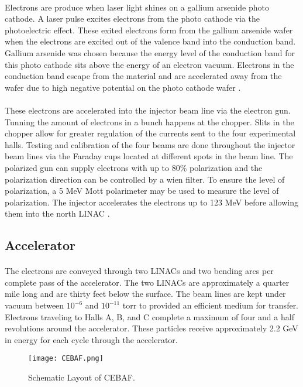 	\paragraph{}Electrons are produce when laser light shines on a gallium arsenide photo cathode. A laser pulse excites electrons from the photo cathode via the photoelectric effect. These exited electrons form from the gallium arsenide wafer when the electrons are excited out of the valence band into the conduction band. Gallium arsenide was chosen because the energy level of the conduction band for this photo cathode sits above the energy of an electron vacuum. Electrons in the conduction band  escape from the material and are accelerated away from the wafer due to high negative potential on the photo cathode wafer \cite{sane}. 
	\paragraph{}These electrons are accelerated into the injector beam line via the electron gun. Tunning the amount of electrons in a bunch happens at the chopper. Slits in the chopper allow for greater regulation of the currents sent to the four experimental halls. Testing and calibration of the four beams are done throughout the injector beam lines via the Faraday cups located at different spots in the beam line. The polarized gun can supply electrons with up to 80$\%$ polarization and the polarization direction can be controlled by a wien filter. To ensure the level of polarization, a 5 MeV Mott polarimeter may be used to measure the level of polarization\cite{HallA}. The injector accelerates the electrons up to 123 MeV before allowing them into the north LINAC	\cite{CEBAF,ref:photogun,ref:4beams}.
\subsection{Accelerator}
	\paragraph{} The electrons are conveyed through two LINACs and two bending arcs per complete pass of the accelerator. The two LINACs are approximately a quarter mile long and are thirty feet below the surface. The beam lines are kept under vacuum between $10^{-6}$ and $10^{-11}$ torr to provided an efficient medium for transfer.  Electrons traveling to Halls A, B, and C complete a maximum of four and a half revolutions around the accelerator. These particles receive approximately 2.2 GeV in energy for each cycle through the accelerator. 
	\begin{figure}[h]
		\centering
		\caption{Schematic Layout of CEBAF. }
		\label{CEBAF}
		\texttt{[image: CEBAF.png]} 
	\end{figure} 
